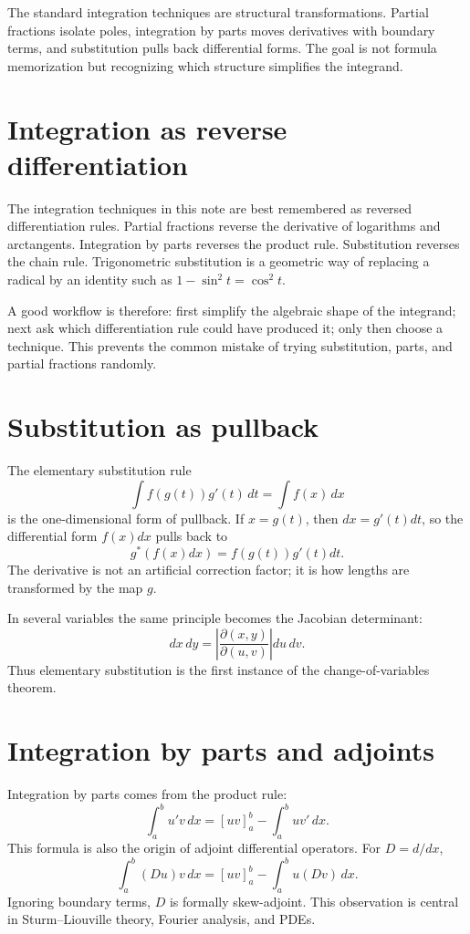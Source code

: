 The standard integration techniques are structural transformations.  Partial fractions isolate poles, integration by parts moves derivatives with boundary terms, and substitution pulls back differential forms.  The goal is not formula memorization but recognizing which structure simplifies the integrand.

\section{Integration as reverse differentiation}

The integration techniques in this note are best remembered as reversed differentiation rules.  Partial fractions reverse the derivative of logarithms and arctangents.  Integration by parts reverses the product rule.  Substitution reverses the chain rule.  Trigonometric substitution is a geometric way of replacing a radical by an identity such as \(1-\sin^2t=\cos^2t\).

A good workflow is therefore: first simplify the algebraic shape of the integrand; next ask which differentiation rule could have produced it; only then choose a technique.  This prevents the common mistake of trying substitution, parts, and partial fractions randomly.

\section{Substitution as pullback}

The elementary substitution rule
\[
  \int f(g(t))g'(t)\,dt=\int f(x)\,dx
\]
is the one-dimensional form of pullback.  If $x=g(t)$, then $dx=g'(t)dt$, so the differential form $f(x)dx$ pulls back to
\[
  g^*(f(x)dx)=f(g(t))g'(t)dt.
\]
The derivative is not an artificial correction factor; it is how lengths are transformed by the map $g$.

In several variables the same principle becomes the Jacobian determinant:
\[
  dx\,dy=\left|\frac{\partial(x,y)}{\partial(u,v)}\right|du\,dv.
\]
Thus elementary substitution is the first instance of the change-of-variables theorem.

\section{Integration by parts and adjoints}

Integration by parts comes from the product rule:
\[
  \int_a^b u'v\,dx=[uv]_a^b-\int_a^b uv'\,dx.
\]
This formula is also the origin of adjoint differential operators.  For $D=d/dx$,
\[
  \int_a^b (Du)v\,dx=[uv]_a^b-\int_a^b u(Dv)\,dx.
\]
Ignoring boundary terms, $D$ is formally skew-adjoint.  This observation is central in Sturm--Liouville theory, Fourier analysis, and PDEs.

